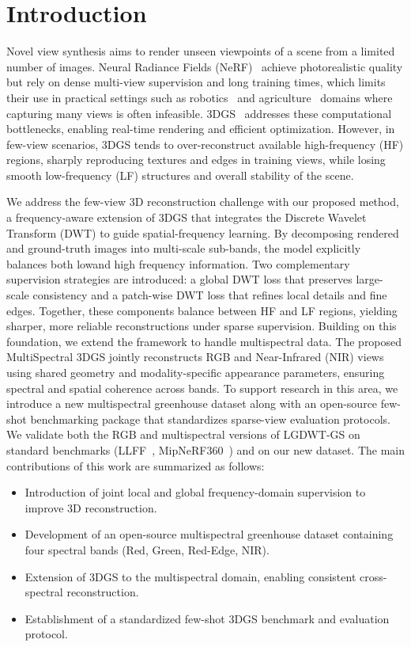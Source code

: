 \section{Introduction}

Novel view synthesis aims to render unseen viewpoints of a scene from a limited number of images. Neural Radiance Fields (NeRF)~\cite{mildenhall2021nerf} achieve photorealistic quality but rely on dense multi-view supervision and long training times, which limits their use in practical settings such as robotics~\cite{irshad2022neuralfields} and agriculture~\cite{chen2022plantnerf} domains where capturing many views is often infeasible. 3DGS~\cite{kerbl20233d} addresses these computational bottlenecks, enabling real-time rendering and efficient optimization. However, in few-view scenarios, 3DGS tends to over-reconstruct available high-frequency (HF) regions, sharply reproducing textures and edges in training views, while losing smooth low-frequency (LF) structures and overall stability of the scene\cite{nguyen2025dwtnerf}. 

We address the few-view 3D reconstruction challenge with our proposed method, a frequency-aware extension of 3DGS that integrates the Discrete Wavelet Transform (DWT) to guide spatial-frequency learning. By decomposing rendered and ground-truth images into multi-scale sub-bands, the model explicitly balances both lowand high frequency information. Two complementary supervision strategies are introduced: a global DWT loss that preserves large-scale consistency and a patch-wise DWT loss that refines local details and fine edges. Together, these components balance between HF and LF regions, yielding sharper, more reliable reconstructions under sparse supervision. Building on this foundation, we extend the framework to handle multispectral data. The proposed MultiSpectral 3DGS jointly reconstructs RGB and Near-Infrared (NIR) views using shared geometry and modality-specific appearance parameters, ensuring spectral and spatial coherence across bands. To support research in this area, we introduce a new multispectral greenhouse dataset along with an open-source few-shot benchmarking package that standardizes sparse-view evaluation protocols.  We validate both the RGB and multispectral versions of LGDWT-GS on standard benchmarks (LLFF~\cite{mildenhall2019llff}, MipNeRF360~\cite{barron2022mipnerf360}) and on our new dataset. The main contributions of this work are summarized as follows:
\begin{itemize}
    \item Introduction of joint local and global frequency-domain supervision to improve 3D reconstruction.  
    \item Development of an open-source multispectral greenhouse dataset containing four spectral bands (Red, Green, Red-Edge, NIR).  
    \item Extension of 3DGS to the multispectral domain, enabling consistent cross-spectral reconstruction.  
    \item Establishment of a standardized few-shot 3DGS benchmark and evaluation protocol.  
\end{itemize}

